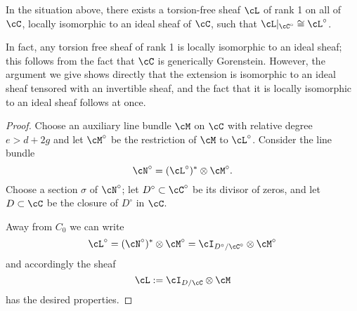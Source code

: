 \begin{lemma}\label{limit sheaf}
In the situation above, there exists a torsion-free sheaf $\cL$ of rank 1 on all of $\cC$, locally isomorphic to
an ideal sheaf of $\cC$, such that $\cL|_{\cC^\circ} \cong \cL^\circ$.
\end{lemma}

In fact, any torsion free sheaf of rank 1 is locally isomorphic
to an ideal sheaf; this follows from the fact that $\cC$ is generically Gorenstein. However, the argument we give 
shows directly that the extension is isomorphic to an ideal sheaf tensored with an invertible sheaf, and the fact that
it is locally isomorphic to an ideal sheaf follows at once.

\begin{proof} Choose an auxiliary line bundle $\cM$ on $\cC$ with relative degree $e > d + 2g$ and let $\cM^\circ$ be the restriction of $\cM$ to $\cL^\circ$. Consider the line bundle 
$$
\cN^\circ = (\cL^\circ)^* \otimes \cM^\circ.
$$
Choose a section $\sigma$ of $\cN^\circ$; let $D^\circ \subset \cC^\circ$ be its divisor of zeros, and let $D \subset \cC$ be the closure of $D^\circ$ in $\cC$. 

Away from $C_0$ we can write
$$
\cL^\circ = (\cN^\circ)^* \otimes \cM^\circ = \cI_{D^\circ/\cC^\circ} \otimes \cM^\circ
$$
and accordingly the sheaf
$$
\cL := \cI_{D/\cC} \otimes \cM
$$
has the desired properties. 
\end{proof}

%

